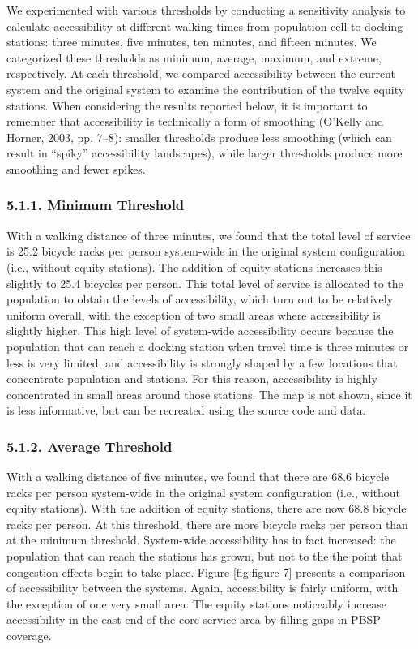 \documentclass[]{elsarticle} %
\begin{document}
We experimented with various thresholds by conducting a sensitivity
analysis to calculate accessibility at different walking times from
population cell to docking stations: three minutes, five minutes, ten
minutes, and fifteen minutes. We categorized these thresholds as
minimum, average, maximum, and extreme, respectively. At each threshold,
we compared accessibility between the current system and the original
system to examine the contribution of the twelve equity stations. When
considering the results reported below, it is important to remember that
accessibility is technically a form of smoothing (O'Kelly and Horner,
2003, pp. 7--8): smaller thresholds produce less smoothing (which can
result in ``spiky'' accessibility landscapes), while larger thresholds
produce more smoothing and fewer spikes.

\hypertarget{minimum-threshold}{%
\subsubsection{5.1.1. Minimum Threshold}\label{minimum-threshold}}

With a walking distance of three minutes, we found that the total level
of service is 25.2 bicycle racks per person system-wide in the original
system configuration (i.e., without equity stations). The addition of
equity stations increases this slightly to 25.4 bicycles per person.
This total level of service is allocated to the population to obtain the
levels of accessibility, which turn out to be relatively uniform
overall, with the exception of two small areas where accessibility is
slightly higher. This high level of system-wide accessibility occurs
because the population that can reach a docking station when travel time
is three minutes or less is very limited, and accessibility is strongly
shaped by a few locations that concentrate population and stations. For
this reason, accessibility is highly concentrated in small areas around
those stations. The map is not shown, since it is less informative, but
can be recreated using the source code and data.

\hypertarget{average-threshold}{%
\subsubsection{5.1.2. Average Threshold}\label{average-threshold}}

With a walking distance of five minutes, we found that there are 68.6
bicycle racks per person system-wide in the original system
configuration (i.e., without equity stations). With the addition of
equity stations, there are now 68.8 bicycle racks per person. At this
threshold, there are more bicycle racks per person than at the minimum
threshold. System-wide accessibility has in fact increased: the
population that can reach the stations has grown, but not to the the
point that congestion effects begin to take place. Figure
\ref{fig:figure-7} presents a comparison of accessibility between the
systems. Again, accessibility is fairly uniform, with the exception of
one very small area. The equity stations noticeably increase
accessibility in the east end of the core service area by filling gaps
in PBSP coverage.
\end{document}
